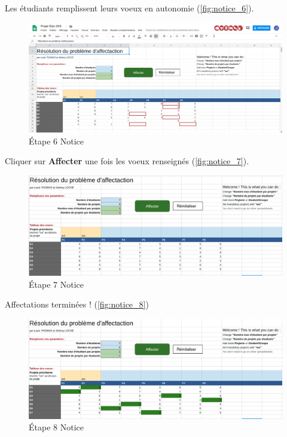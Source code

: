 \documentclass[final,poster]{polytech/polytech}
\begin{document}
Les étudiants remplissent leurs voeux en autonomie (\autoref{fig:notice_6}).
\begin{figure}[htbp]
\includegraphics[width=13cm]{images/notice/notice_6}
\caption{\label{fig:notice_6}\'Etape 6 Notice}
\end{figure}

Cliquer sur \textbf{Affecter} une fois les voeux renseignés (\autoref{fig:notice_7}).
\begin{figure}[htbp]
\includegraphics[width=13cm]{images/notice/notice_7}
\caption{\label{fig:notice_7}\'Etape 7 Notice}
\end{figure}

Affectations terminées ! (\autoref{fig:notice_8})
\begin{figure}[htbp]
\includegraphics[width=12cm]{images/notice/notice_8}
\caption{\label{fig:notice_8}\'Etape 8 Notice}
\end{figure}




\end{document}
